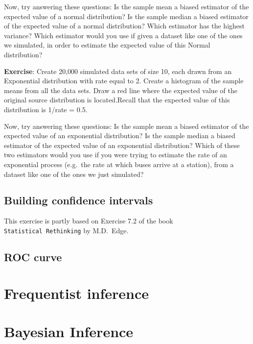 \documentclass[
]{book}
\begin{document}
Now, try answering these questions: Is the sample mean a biased estimator of the expected value of a normal distribution? Is the sample median a biased estimator of the expected value of a normal distribution? Which estimator has the highest variance? Which estimator would you use if given a dataset like one of the ones we simulated, in order to estimate the expected value of this Normal distribution?

\textbf{Exercise}: Create 20,000 simulated data sets of size 10, each drawn from an Exponential distribution with rate equal to 2. Create a histogram of the sample means from all the data sets. Draw a red line where the expected value of the original source distribution is located.Recall that the expected value of this distribution is 1/rate = 0.5.

Now, try answering these questions: Is the sample mean a biased estimator of the expected value of an exponential distribution? Is the sample median a biased estimator of the expected value of an exponential distribution? Which of these two estimators would you use if you were trying to estimate the rate of an exponential process (e.g.~the rate at which buses arrive at a station), from a dataset like one of the ones we just simulated?

\hypertarget{building-confidence-intervals}{%
\section{Building confidence intervals}\label{building-confidence-intervals}}

This exercise is partly based on Exercise 7.2 of the book \texttt{Statistical\ Rethinking} by M.D.~Edge.

\hypertarget{roc-curve}{%
\section{ROC curve}\label{roc-curve}}

\hypertarget{frequentist-inference}{%
\chapter{Frequentist inference}\label{frequentist-inference}}

\hypertarget{bayesian-inference}{%
\chapter{Bayesian Inference}\label{bayesian-inference}}
\end{document}
